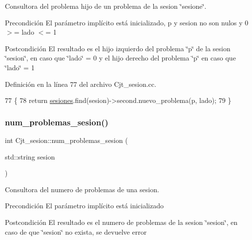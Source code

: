 Consultora del problema hijo de un problema de la sesion \char`\"{}sesione\char`\"{}. 

\begin{DoxyPrecond}{Precondición}
El parámetro implícito está inicializado, p y sesion no son nulos y 0 $>$= lado $<$= 1 
\end{DoxyPrecond}
\begin{DoxyPostcond}{Postcondición}
El resultado es el hijo izquierdo del problema \char`\"{}p\char`\"{} de la sesion \char`\"{}sesion\char`\"{}, en caso que \char`\"{}lado\char`\"{} = 0 y el hijo derecho del problema \char`\"{}p\char`\"{} en caso que \char`\"{}lado\char`\"{} = 1 
\end{DoxyPostcond}


Definición en la línea 77 del archivo Cjt\+\_\+sesion.\+cc.


\begin{DoxyCode}
77                                                                           \{
78   \textcolor{keywordflow}{return} \mbox{\hyperlink{class_cjt__sesion_abac1c2ee3cccc598a8274c7da869aa9b}{sesiones}}.find(sesion)->second.nuevo\_problema(p, lado);
79 \}
\end{DoxyCode}
\mbox{\label{class_cjt__sesion_ac761936095af984ee9a39fdcdf25219c}} 
\subsubsection{\texorpdfstring{num\+\_\+problemas\+\_\+sesion()}{num\_problemas\_sesion()}}
{\footnotesize\ttfamily int Cjt\+\_\+sesion\+::num\+\_\+problemas\+\_\+sesion (\begin{DoxyParamCaption}\item[{std\+::string}]{sesion }\end{DoxyParamCaption})}



Consultora del numero de problemas de una sesion. 

\begin{DoxyPrecond}{Precondición}
El parámetro implícito está inicializado 
\end{DoxyPrecond}
\begin{DoxyPostcond}{Postcondición}
El resultado es el numero de problemas de la sesion \char`\"{}sesion\char`\"{}, en caso de que \char`\"{}sesion\char`\"{} no exista, se devuelve error 
\end{DoxyPostcond}


